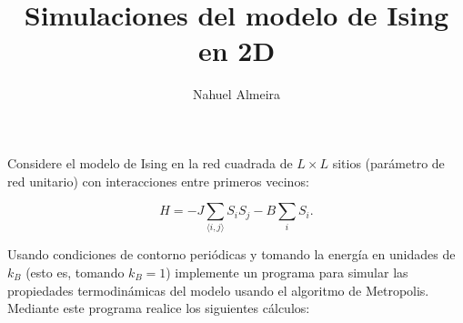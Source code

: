 \documentclass[10pt]{article}
\begin{document}
\author{Nahuel Almeira}

\title{Simulaciones del modelo de Ising en 2D}

\maketitle


Considere el modelo de Ising en la red cuadrada de $L \times L$ sitios (parámetro de red unitario) con interacciones entre primeros vecinos:

\begin{equation}
H = - J \sum_{\langle i,j\rangle} S_i S_j - B \sum_i S_i.
\end{equation}

Usando condiciones de contorno periódicas y tomando la energía en unidades de $k_B$ (esto es, tomando $k_B = 1$) implemente un programa para simular las propiedades termodinámicas del modelo usando el algoritmo de Metropolis. Mediante este programa realice los siguientes cálculos:


\pagebreak
\end{document}
